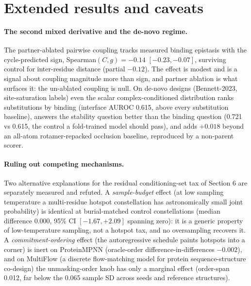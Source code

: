 \documentclass{article} %
\begin{document}
\section{Extended results and caveats}

\paragraph{The second mixed derivative and the de-novo regime.} The partner-ablated pairwise coupling tracks
measured binding epistasis with the cycle-predicted sign, Spearman$(C, g) = -0.14$ $[-0.23, -0.07]$, surviving
control for inter-residue distance (partial $-0.12$). The effect is modest and is a signal about coupling
magnitude more than sign, and partner ablation is what surfaces it: the un-ablated coupling is null. On de-novo
designs (Bennett-2023, site-saturation labels) even the scalar complex-conditioned distribution ranks
substitutions by binding (interface AUROC 0.615, above every substitution baseline), answers the stability
question better than the binding question (0.721 vs 0.615, the control a fold-trained model should pass), and adds
$+0.018$ beyond an all-atom rotamer-repacked occlusion baseline, reproduced by a non-parent scorer.

\paragraph{Ruling out competing mechanisms.} Two alternative explanations for the residual conditioning-set tax of
Section 6 are separately measured and refuted. A \emph{sample-budget} effect (at low sampling temperature a
multi-residue hotspot constellation has astronomically small joint probability) is identical at burial-matched
control constellations (median difference 0.000, 95\% CI $[-1.67, +2.09]$ spanning zero): it is a generic property
of low-temperature sampling, not a hotspot tax, and no oversampling recovers it. A \emph{commitment-ordering}
effect (the autoregressive schedule paints hotspots into a corner) is inert on ProteinMPNN (oracle-order
difference-in-differences $-0.002$), and on MultiFlow (a discrete flow-matching model for protein
sequence-structure co-design) the unmasking-order knob has only a marginal effect
(order-span 0.012, far below the 0.065 sample SD across seeds and reference structures).
\end{document}
